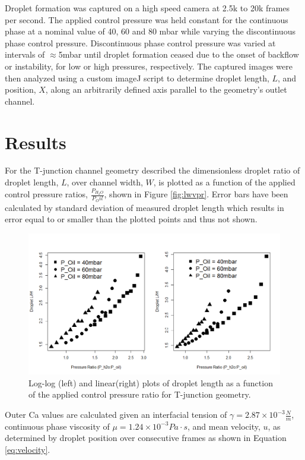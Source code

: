 Droplet formation was captured on a high speed camera at 2.5k to 20k frames per second. The applied control pressure was held constant for the continuous phase at a nominal value of 40, 60 and 80 mbar while varying the discontinuous phase control pressure. Discontinuous phase control pressure was varied at intervals of $\approx$5mbar until droplet formation ceased due to the onset of backflow or instability, for low or high pressures, respectively. The captured images were then analyzed using a custom imageJ script to determine droplet length, $L$, and position, $X$, along an arbitrarily defined axis parallel to the geometry's outlet channel.
 
\section{Results}

For the T-junction channel geometry described the dimensionless droplet ratio of droplet length, $L$, over channel width, $W$, is plotted as a function of the applied control pressure ratios, $\frac{P_{H_2O}}{P_Oil}$, shown in Figure \vref{fig:lwvpr}. Error bars have been calculated by standard deviation of measured droplet length which results in error equal to or smaller than the plotted points and thus not shown.

\begin{figure}[H]
\centering 
\includegraphics[width=01.0\columnwidth]{lwvpr.PNG} 
\caption[Droplet Length as a Function of Applied Control Pressure Ratio]{Log-log (left) and linear(right) plots of droplet length as a function of the applied control pressure ratio for T-junction geometry.} 
\label{fig:lwvpr} 
\end{figure}

Outer Ca values are calculated given an interfacial tension of $\gamma = 2.87 \times 10^{-3}\frac{N}{m}$, continuous phase viscosity of $\mu = 1.24 \times 10^{-3} Pa \cdot s$\cite{3M2009}, and mean velocity, $u$, as determined by droplet position over consecutive frames as shown in Equation \vref{eq:velocity}.

